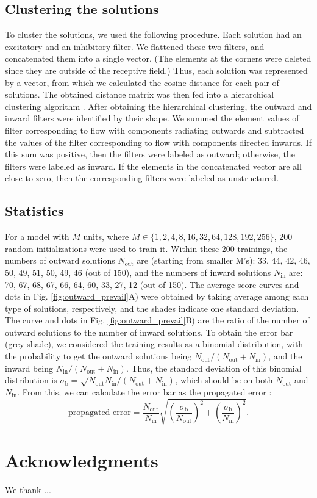 \documentclass[pdftex,9pt,lineno]{elife}
\begin{document}
\subsection{Clustering the solutions}
To cluster the solutions, we used the following procedure. Each solution had an excitatory and an inhibitory filter. We flattened these two filters, and concatenated them into a single vector. (The elements at the corners were deleted since they are outside of the receptive field.) Thus, each solution was represented by a vector, from which we calculated the cosine distance for each pair of solutions. The obtained distance matrix was then fed into a hierarchical clustering algorithm \citep{2020SciPy-NMeth}. After obtaining the hierarchical clustering, the outward and inward filters were identified by their shape. We summed the element values of filter corresponding to flow with components radiating outwards and subtracted the values of the filter corresponding to flow with components directed inwards. If this sum was positive, then the filters were labeled as outward; otherwise, the filters were labeled as inward. If the elements in the concatenated vector are all close to zero, then the corresponding filters were labeled as unstructured.

\subsection{Statistics}
For a model with $M$ units, where $M \in \{1,2,4,8,16,32,64,128,192,256\}$, 200 random initializations were used to train it. Within these 200 trainings, the numbers of outward solutions $N_{\text{out}}$ are (starting from smaller M's): 33, 44, 42, 46, 50, 49, 51, 50, 49, 46 (out of 150), and the numbers of inward solutions $N_{\text{in}}$ are: 70, 67, 68, 67, 66, 64, 60, 33, 27, 12 (out of 150). The average score curves and dots in Fig. \ref{fig:outward_prevail}A) were obtained by taking average among each type of solutions, respectively, and the shades indicate one standard deviation. The curve and dots in Fig. \ref{fig:outward_prevail}B) are the ratio of the number of outward solutions to the number of inward solutions. To obtain the error bar (grey shade), we considered the training results as a binomial distribution, with the probability to get the outward solutions being $N_{\text{out}}/(N_{\text{out}}+N_{\text{in}})$, and the inward being $N_{\text{in}}/(N_{\text{out}}+N_{\text{in}})$. Thus, the standard deviation of this binomial distribution is $\sigma_{\text{b}}=\sqrt{N_{\text{out}}N_{\text{in}}/(N_{\text{out}}+N_{\text{in}})}$, which should be on both $N_{\text{out}}$ and $N_{\text{in}}$. From this, we can calculate the error bar as the propagated error \citep{caldwell2015propagation}:
\begin{equation}
\text{propagated error} = \frac{N_{\text{out}}}{N_{\text{in}}}\sqrt{\left(\frac{\sigma_{\text{b}}}{N_{\text{out}}}\right)^{2}+\left(\frac{\sigma_{\text{b}}}{N_{\text{in}}}\right)^{2}}.
\end{equation}




\section{Acknowledgments}

We thank ...


\end{document}
